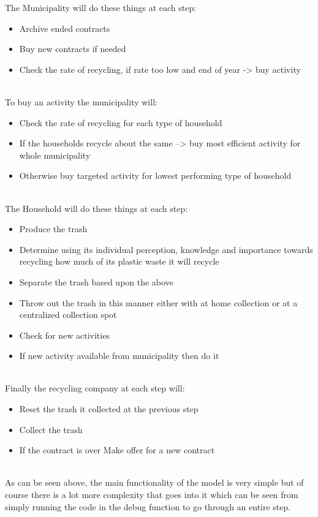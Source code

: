 The Municipality will do these things at each step: 
\begin{itemize}
    \item Archive ended contracts
    \item Buy new contracts if needed 
    \item Check the rate of recycling, if rate too low and end of year -> buy activity
\end{itemize}
\\
To buy an activity the municipality will: 
\begin{itemize}
    \item Check the rate of recycling for each type of household
    \item If the households recycle about the same --> buy most efficient activity for whole municipality
    \item Otherwise buy targeted activity for lowest performing type of household
\end{itemize}
\\
The Household will do these things at each step: 
\begin{itemize}
    \item Produce the trash
    \item Determine using its individual perception, knowledge and importance towards recycling how much of its plastic waste it will recycle
    \item Separate the trash based upon the above
    \item Throw out the trash in this manner either with at home collection or at a centralized collection spot
    \item Check for new activities 
    \item If new activity available from municipality then do it 
\end{itemize}
\\
Finally the recycling company at each step will: 
\begin{itemize}
    \item Reset the trash it collected at the previous step
    \item Collect the trash 
    \item If the contract is over Make offer for a new contract
\end{itemize}
\\
\noindent As can be seen above, the main functionality of the model is very simple but of course there is a lot more complexity that goes into it which can be seen from simply running the code in the debug function to go through an entire step. 

